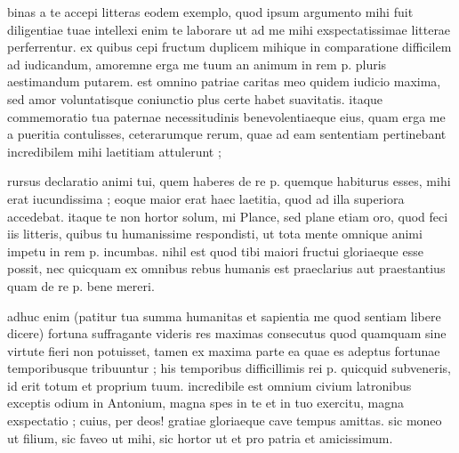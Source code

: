


 binas a te accepi litteras eodem exemplo, quod ipsum argumento mihi fuit diligentiae tuae intellexi enim te laborare ut ad me mihi exspectatissimae litterae perferrentur. ex quibus cepi fructum duplicem mihique in comparatione difficilem ad iudicandum, amoremne erga me tuum an animum in rem p. pluris aestimandum putarem. est omnino patriae caritas meo quidem iudicio maxima, sed amor voluntatisque coniunctio plus certe habet suavitatis. itaque commemoratio tua paternae necessitudinis benevolentiaeque eius, quam erga me a pueritia contulisses, ceterarumque rerum, quae ad eam sententiam pertinebant incredibilem mihi laetitiam attulerunt ;

 rursus declaratio animi tui, quem haberes de re p. quemque habiturus esses, mihi erat iucundissima ; eoque maior erat haec laetitia, quod ad illa superiora accedebat. itaque te non hortor solum, mi Plance, sed plane etiam oro, quod feci iis litteris, quibus tu humanissime respondisti, ut tota mente omnique animi impetu in rem p. incumbas. nihil est quod tibi maiori fructui gloriaeque esse possit, nec quicquam ex omnibus rebus humanis est praeclarius aut praestantius quam de re p. bene mereri.

 adhuc enim (patitur tua summa humanitas et sapientia me quod sentiam libere dicere) fortuna suffragante videris res maximas consecutus quod quamquam sine virtute fieri non potuisset, tamen ex maxima parte ea quae es adeptus fortunae temporibusque tribuuntur ; his temporibus difficillimis rei p. quicquid subveneris, id erit totum et proprium tuum. incredibile est omnium civium latronibus exceptis odium in Antonium, magna spes in te et in tuo exercitu, magna exspectatio ; cuius, per deos! gratiae gloriaeque cave tempus amittas. sic moneo ut filium, sic faveo ut mihi, sic hortor ut et pro patria et amicissimum.
